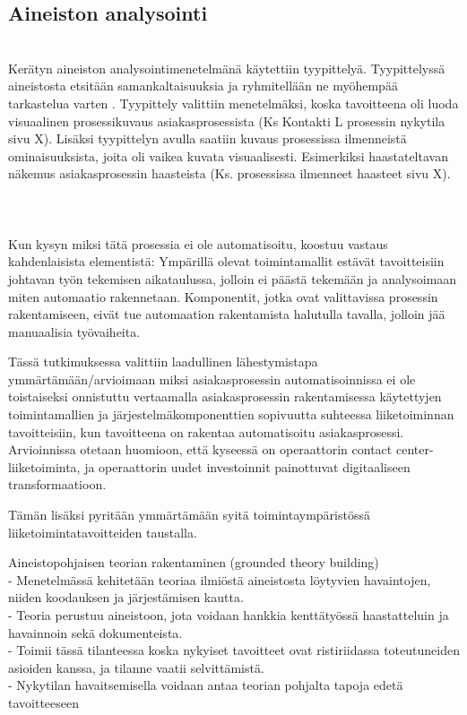 \documentclass[finnish,12pt,a4paper,pdftex]{article}
\begin{document}
\subsection{Aineiston analysointi}\\
Kerätyn aineiston analysointimenetelmänä käytettiin tyypittelyä. Tyypittelyssä aineistosta etsitään samankaltaisuuksia ja ryhmitellään ne myöhempää tarkastelua varten \citep{eskola}. Tyypittely valittiin menetelmäksi, koska tavoitteena oli luoda visuaalinen prosessikuvaus asiakasprosessista (Ks Kontakti L prosessin nykytila sivu X). Lisäksi tyypittelyn avulla saatiin kuvaus prosessissa ilmenneistä ominaisuuksista, joita oli vaikea kuvata visuaalisesti. Esimerkiksi haastateltavan näkemus asiakasprosessin haasteista (Ks. prosessissa ilmenneet haasteet sivu X). \\
\\
\\
\\










Kun kysyn miksi tätä prosessia ei ole automatisoitu, koostuu vastaus kahdenlaisista elementistä: Ympärillä olevat toimintamallit estävät tavoitteisiin johtavan työn tekemisen aikataulussa, jolloin ei päästä tekemään ja analysoimaan miten automaatio rakennetaan. Komponentit, jotka ovat valittavissa prosessin rakentamiseen, eivät tue automaation rakentamista halutulla tavalla, jolloin jää manuaalisia työvaiheita.

Tässä tutkimuksessa valittiin laadullinen lähestymistapa ymmärtämään/arvioimaan miksi asiakasprosessin automatisoinnissa ei ole toistaiseksi onnistuttu vertaamalla asiakasprosessin rakentamisessa käytettyjen toimintamallien ja järjestelmäkomponenttien sopivuutta suhteessa liiketoiminnan tavoitteisiin, kun tavoitteena on rakentaa automatisoitu asiakasprosessi. Arvioinnissa otetaan huomioon, että kyseessä on operaattorin contact center-liiketoiminta, ja operaattorin uudet investoinnit painottuvat digitaaliseen transformaatioon. 

Tämän lisäksi pyritään ymmärtämään syitä toimintaympäristössä liiketoimintatavoitteiden taustalla. 

Aineistopohjaisen teorian rakentaminen (grounded theory building)\\
- Menetelmässä kehitetään teoriaa ilmiöstä aineistosta löytyvien havaintojen, niiden koodauksen ja järjestämisen kautta.\\
- Teoria perustuu aineistoon, jota voidaan hankkia kenttätyössä haastatteluin ja havainnoin sekä dokumenteista.\\
- Toimii tässä tilanteessa koska nykyiset tavoitteet ovat ristiriidassa toteutuneiden asioiden kanssa, ja tilanne vaatii selvittämistä.\\
- Nykytilan havaitsemisella voidaan antaa teorian pohjalta tapoja edetä tavoitteeseen\\
\end{document}
